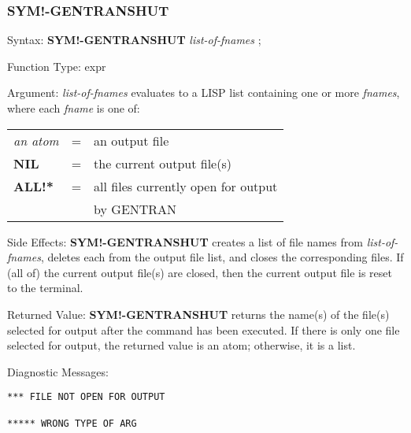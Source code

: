 \subsubsection{SYM!-GENTRANSHUT}
\begin{describe}{Syntax:}
{\bf SYM!-GENTRANSHUT} {\it list-of-fnames\/} ;
\end{describe}
\begin{describe}{Function Type:}
expr
\end{describe}
\begin{describe}{Argument:}
{\it list-of-fnames\/} evaluates to a LISP list containing one or more
{\it fnames}, where each {\it fname\/} is one of:

\begin{tabular}{lll}
{\it an atom} & = &  an output file\\
{\bf NIL} & = & the current output file(s)\\
{\bf ALL!*} & = & all files currently open for output \\
& & by GENTRAN\\
\end{tabular}
\end{describe}
\begin{describe}{Side Effects:}
{\bf SYM!-GENTRANSHUT} creates a list of file names from {\it list-of-fnames},
deletes each from the output file list,
and closes the corresponding files.  If (all of) the
current output file(s) are closed, then the current output
file is reset to the terminal.
\end{describe}
\begin{describe}{Returned Value:}
{\bf SYM!-GENTRANSHUT} returns the name(s) of the file(s) selected for
output after the command has been executed.  If there is
only one file selected for output, the returned value is an atom;
otherwise, it is a list.
\end{describe}
\begin{describe}{Diagnostic Messages:}
\begin{verbatim}
*** FILE NOT OPEN FOR OUTPUT

***** WRONG TYPE OF ARG
\end{verbatim}
\end{describe}

